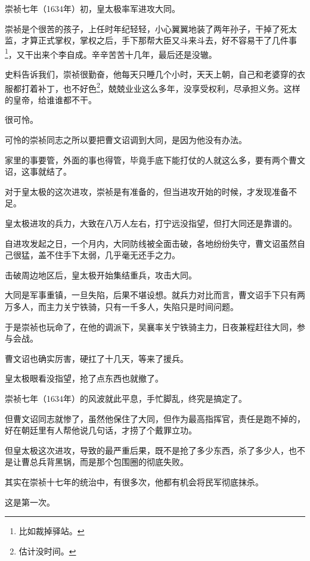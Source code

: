 \begin{multicols}{\theparacolNo}
		崇祯七年（1634年）初，皇太极率军进攻大同。

		崇祯是个很苦的孩子，上任时年纪轻轻，小心翼翼地装了两年孙子，干掉了死太监，才算正式掌权，掌权之后，手下那帮大臣又斗来斗去，好不容易干了几件事\footnote{比如裁掉驿站。}，又干出来个李自成。辛辛苦苦十几年，最后还是没辙。

		史料告诉我们，崇祯很勤奋，他每天只睡几个小时，天天上朝，自己和老婆穿的衣服都打着补丁，也不好色\footnote{估计没时间。}，兢兢业业这么多年，没享受权利，尽承担义务。这样的皇帝，给谁谁都不干。

		很可怜。

		可怜的崇祯同志之所以要把曹文诏调到大同，是因为他没有办法。

		家里的事要管，外面的事也得管，毕竟手底下能打仗的人就这么多，要有两个曹文诏，这事就结了。

		对于皇太极的这次进攻，崇祯是有准备的，但当进攻开始的时候，才发现准备不足。

		皇太极进攻的兵力，大致在八万人左右，打宁远没指望，但打大同还是靠谱的。

		自进攻发起之日，一个月内，大同防线被全面击破，各地纷纷失守，曹文诏虽然自己很猛，盖不住手下太弱，几乎毫无还手之力。

		击破周边地区后，皇太极开始集结重兵，攻击大同。

		大同是军事重镇，一旦失陷，后果不堪设想。就兵力对比而言，曹文诏手下只有两万多人，而主力关宁铁骑，只有一千多人，失陷只是时间问题。

		于是崇祯也玩命了，在他的调派下，吴襄率关宁铁骑主力，日夜兼程赶往大同，参与会战。

		曹文诏也确实厉害，硬扛了十几天，等来了援兵。

		皇太极眼看没指望，抢了点东西也就撤了。

		崇祯七年（1634年）的风波就此平息，手忙脚乱，终究是搞定了。

		但曹文诏同志就惨了，虽然他保住了大同，但作为最高指挥官，责任是跑不掉的，好在朝廷里有人帮他说几句话，才捞了个戴罪立功。

		但皇太极这次进攻，导致的最严重后果，既不是抢了多少东西，杀了多少人，也不是让曹总兵背黑锅，而是那个包围圈的彻底失败。

		其实在崇祯十七年的统治中，有很多次，他都有机会将民军彻底抹杀。

		这是第一次。
		\ifnum{}
	\end{multicols}
\fi
\newpage
